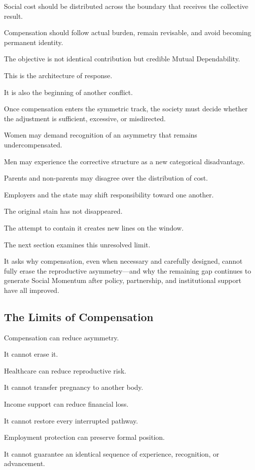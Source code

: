Social cost should be distributed across the boundary that receives the collective result.

Compensation should follow actual burden, remain revisable, and avoid becoming permanent identity.

The objective is not identical contribution but credible Mutual Dependability.

This is the architecture of response.

It is also the beginning of another conflict.

Once compensation enters the symmetric track, the society must decide whether the adjustment is sufficient, excessive, or misdirected.

Women may demand recognition of an asymmetry that remains undercompensated.

Men may experience the corrective structure as a new categorical disadvantage.

Parents and non-parents may disagree over the distribution of cost.

Employers and the state may shift responsibility toward one another.

The original stain has not disappeared.

The attempt to contain it creates new lines on the window.

The next section examines this unresolved limit.

It asks why compensation, even when necessary and carefully designed, cannot fully erase the reproductive asymmetry—and why the remaining gap continues to generate Social Momentum after policy, partnership, and institutional support have all improved.

\subsection*{\textbf{The Limits of Compensation}}


Compensation can reduce asymmetry.

It cannot erase it.

Healthcare can reduce reproductive risk.

It cannot transfer pregnancy to another body.

Income support can reduce financial loss.

It cannot restore every interrupted pathway.

Employment protection can preserve formal position.

It cannot guarantee an identical sequence of experience, recognition, or advancement.

